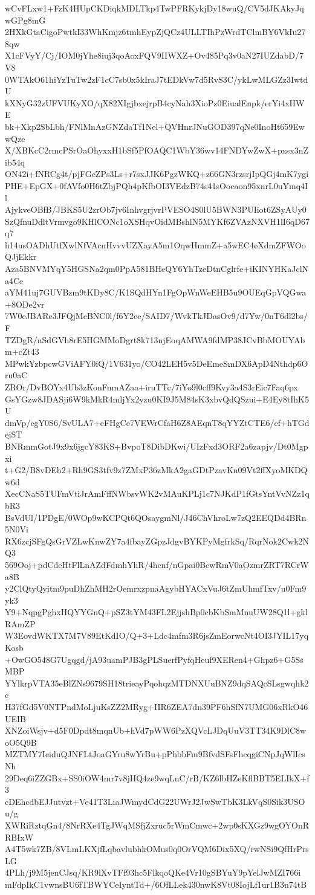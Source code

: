 wCvFLxw1+FzK4HUpCKDiqkMDLTkp4TwPFRKykjDy18wuQ/CV5dJKAkyJqwGPg8mG
2HXkGtaCigoPwtkI33WhKmjz6tmhEypZjQCz4ULLTIhPzWrdTClmBY6VkIu278qw
X1cFVyY/Cj/IOM0jYhe8iuj3qoAoxFQV9IIWXZ+Ov485Pq3v0aN27IUZdabD/7V8
0WTAkO61hiYzTuTw2zF1cC7sb0x5kIraJ7tEDkVw7d5RvS3C/ykLwMLGZz3IwtdU
kXNyG32zUFVUKyXO/qX82XIgjbxejrpB4cyNah3XioPz0EiualEnpk/erYi4xHWE
bk+Xkp2SbLbh/FNlMnAzGNZdaTf1Nel+QVHnrJNuGOD397qNe0InoHt659EwwQze
X/XBKcC2rmcPSrOaOhyxxH1bSf5PfOAQC1WbY36wv14FNDYwZwX+pxsx3nZib54q
ON42i+fNRCg4t/pjFGcZPs3Ls+r7sxJJK6PgzWKQ+z66GN3rzsrjIpQGj4mK7ygi
PHE+EpGX+0fAVfo0H6tZbjPQh4pKfbOI3VEdzB74s41sOocaon95xnrL0uYmq4Il
AjykveOBfB/JBKS5U2zrOb7jv6InhvgrjvrPVESO4S0lU5BWN3PUIiot6ZSyAUy0
SzQfnuDdltVrmvgo9KHlCONc1oXSHqvOidMBshlN5MYKf6ZVAzNXVH1lI6qD67q7
h14usOADhUtfXwlNfVAcnHvvvUZXayA5m1OqwHmmZ+a5wEC4eXdmZFWOoQJjEkkr
Aza5BNVMYqY5HGSNa2qm0PpA581BHeQY6YhTzeDtnCglrfe+iKINYHKaJclNa4Ce
aYM41uj7GUVBzm9tKDy8C/K1SQdHYn1FgOpWnWeEHB5u9OUEqGpVQGwa+8ODe2vr
7W0eJBARe3JFQjMcBNC0l/f6Y2ee/SAID7/WvkTkJDasOv9/d7Yw/0nT6dl2bs/F
TZDgR/nSdGVh8rE5HGMMoDgrt8k713njEoqAMWA9fdMP38JCvBbMOUYAbm+cZt43
MPwkYzbpcwGViAFY0iQ/1V631yo/CO42LEH5v5DeEmeSmDX6ApD4Nthdp6Oru0aC
ZROr/DvBOYx4Ub3zKonFnmAZaa+iruTTc/7iYo9l0cff9Kvy3a4S3rEic7Faq6px
GsYGzw8JDASji6W9kMkR4mljYx2yzu0KI9J5M84sK3xbvQdQSzui+E4Ey8tIhK5U
dmVp/cgY0S6/SvULA7+eFHgCe7VEWrCfaH6Z8AEqnT8qYYZtCTE6/cf+hTGdejST
BNRmmGotJ9x9x6jgcY83KS+BvpoT8DibDKwi/UIzFxd3ORF2a6zapjv/Dt0Mgpxi
t+G2/B8vDEh2+Rh9GS3tfv9z7ZMxP36zMkA2gaGDtPzavKn09Vt2ffXyoMKDQw6d
XecCNaS5TUFmVtiJrAmFffNWbsvWK2vMAuKPLj1c7NJKdP1fGtsYntVvNZz1qbR3
BsVdUl/1PDgE/0WOp9wKCPQt6QOsaygmNl/J46ChVhroLw7zQ2EEQDd4BRn5N0Vi
RX6zcjSFgQsGrVZLwKnwZY7a4fbayZGpzJdgvBYKPyMgfrkSq/RqrNok2Cwk2NQ3
569Ooj+pdCdeHtFlLnAZdFdmhYhR/4hcnf/nGpai0BcwRmV0aOzmrZRT7RCrWa8B
y2ClQtyQyitm9puDhZhMH2rOemrxzpnaAgybHYACxVuJ6tZmUhmfTxv/u0Fm9yk3
Y9+NqpgPghxHQYYGnQ+pSZ3tYM43FL2EjjshBp0cbKbSmMnuUW28Q1l+gklRAmZP
W3EovdWKTX7M7V89EtKdIO/Q+3+Ldc4mfm3R6jsZmEorwcNt4OI3JYIL17yqKosb
+OwGO548G7Ugqgd/jA93uamPJB3gPLSuerfPyfqHeuf9XERen4+Ghpz6+G5SsMBP
YYlkrpVTA35eBlZNs9679SH18trieayPqohqzMTDNXUuBNZ9dqSAQcSLsgwqhk2c
H37fGd5V0NTPndMoLjuKsZZ2MRyg+IIR6ZEA7dn39PF6hSfN7UMG06xRkO46UEIB
XNZoiWsjv+d5F0Dpdt8mqnUb+hVd7pWW6PzXQVcLJDqUuV3TT34K9DlC8woO5Q9B
MZTMY7IeiduQJNFLtJoaGYru8wYrBu+pPhbbFm9BfvdSFsFhcqgiCNpJqWlIcsNh
29Deq6iZZGBx+SS0iOW4mr7v8jHQ4ze9wqLnC/rB/KZ6lbHZeKflBBT5ELIkX+f3
cDEhcdbEJJutvzt+Ve41T3LiaJWmydCdG22UWrJ2JwSwTbK3LkVqS0Sik3USOu/g
XWRiRztqGn4/8NrRXe4TgJWqMSfjZxruc5rWmCmwc+2wp0sKXGz9wgOYOnRRBIxW
A4T5wk7ZB/8VLmLKXjfLqbavlubhkOMus0q0OrVQM6Dix5XQ/rwNSi9QfHrPrsLG
4PLh/j9M5jenCJsq/KR9lXvTFf93hc5FlkqoQKe4Vr10gSBYuY9pYelJwMZI766i
mFdpIkC1vwnsBU6fTBWYCeIyntTd+/6OfLLek430nwK8Vt08IojLf1ur1B3n74tB
